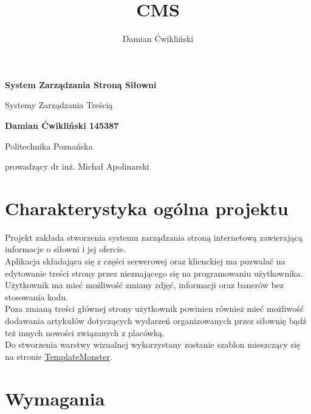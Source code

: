 \documentclass[12pt]{article}
\title{CMS}
\author{Damian Ćwikliński}
\begin{document}
\begin{titlepage}
    \begin{center}
        \vspace*{4cm}
            
        \Huge
        \textbf{System Zarządzania Stroną Siłowni}
            
        \vspace{0.5cm}
        \LARGE
        Systemy Zarządzania Treścią
            
        \vspace{1.5cm}
            
        \textbf{Damian Ćwikliński 145387}
            
        \vfill
            
        Politechnika Poznańska
            
        \vspace{0.8cm}
           
            
        prowadzący dr inż. Michał Apolinarski
            
    \end{center}
\end{titlepage}

\tableofcontents

\newpage
\section{Charakterystyka ogólna projektu}
Projekt zakłada stworzenia systemu zarządzania stroną internetową zawierającą informacje o siłowni i jej ofercie. 
\\

Aplikacja składająca się z części serwerowej oraz klienckiej ma pozwalać na edytowanie treści strony przez nieznającego się na programowaniu użytkownika. Użytkownik ma mieć możliwość zmiany zdjęć, informacji oraz banerów bez stosowania kodu.
\\

Poza zmianą treści głównej strony użytkownik powinien również mieć możliwość dodawania artykułów dotyczących wydarzeń organizowanych przez siłownię bądź też innych nowości związanych z placówką.
\\

Do stworzenia warstwy wizualnej wykorzystany zostanie szablon mieszczący się na stronie \href{https://demo.templatemonster.com/demo/51682.html}{TemplateMonster}.

\newpage
\section{Wymagania}
\end{document}
